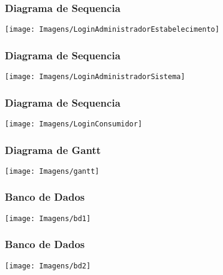 \begin{frame}
	\frametitle{Diagrama de Sequencia}
	\texttt{[image: Imagens/LoginAdministradorEstabelecimento]}
\end{frame}

\begin{frame}
	\frametitle{Diagrama de Sequencia}
	\texttt{[image: Imagens/LoginAdministradorSistema]}
\end{frame}

\begin{frame}
	\frametitle{Diagrama de Sequencia}
	\texttt{[image: Imagens/LoginConsumidor]}
\end{frame}

\begin{frame}
	\frametitle{Diagrama de Gantt}
	\texttt{[image: Imagens/gantt]}
\end{frame}

\begin{frame}
	\frametitle{Banco de Dados}
	\texttt{[image: Imagens/bd1]}
\end{frame}

\begin{frame}
	\frametitle{Banco de Dados}
	\texttt{[image: Imagens/bd2]}
\end{frame}


